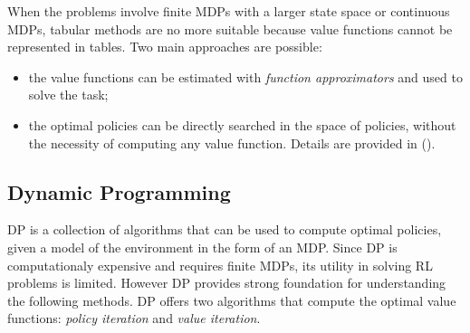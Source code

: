 \newline
When the problems involve finite \ac{MDPs} with a larger state space or continuous \ac{MDPs}, tabular methods are no more suitable because value functions cannot be represented in tables. Two main approaches are possible:
\begin{itemize}
	\item the value functions can be estimated with \emph{function approximators} and used to solve the task;
	\item the optimal policies can be directly searched in the space of policies, without the necessity of computing any value function. Details are provided in ().
\end{itemize}

\subsection{Dynamic Programming}\label{subsec:dp}
\acf{DP} is a collection of algorithms that can be used to compute optimal policies, given a model of the environment in the form of an \ac{MDP}. Since \ac{DP} is computationaly expensive and requires finite \ac{MDPs}, its utility in solving \ac{RL} problems is limited. However \ac{DP} provides strong foundation for understanding the following methods. \ac{DP} offers two algorithms that compute the optimal value functions: \emph{policy iteration} and \emph{value iteration}.

